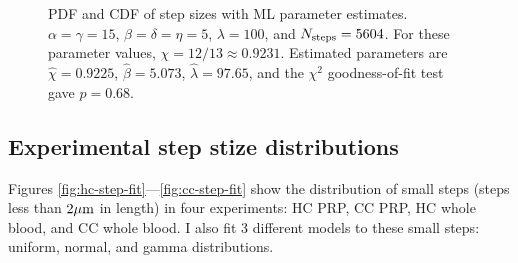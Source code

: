 \documentclass{article}
\newcommand{\tn}{\textnormal}
\begin{document}
\begin{figure}
  \centering
  \begin{subfigure}{0.48\textwidth}
  \end{subfigure}
  \hfill
  \begin{subfigure}{0.48\textwidth}
  \end{subfigure}
  \caption{PDF and CDF of step sizes with ML parameter
    estimates. $\alpha = \gamma = 15$, $\beta = \delta = \eta = 5$,
    $\lambda = 100$, and $N_\tn{steps} = 5604$. For these parameter
    values, $\chi = 12/13 \approx 0.9231$. Estimated parameters are
    $\hat{\chi} = 0.9225$, $\hat{\beta} = 5.073$,
    $\hat{\lambda} = 97.65$, and the $\chi^2$ goodness-of-fit test
    gave $p = 0.68$.}
  \label{fig:fit-cmp-large-a}  
\end{figure}

\subsection{Experimental step stize distributions}
\label{sec:exper-step-stize}

Figures \ref{fig:hc-step-fit}---\ref{fig:cc-step-fit} show the
distribution of small steps (steps less than $2 \mu\tn{m}$ in length)
in four experiments: HC PRP, CC PRP, HC whole blood, and CC whole
blood. I also fit 3 different models to these small steps: uniform,
normal, and gamma distributions.
\end{document}
